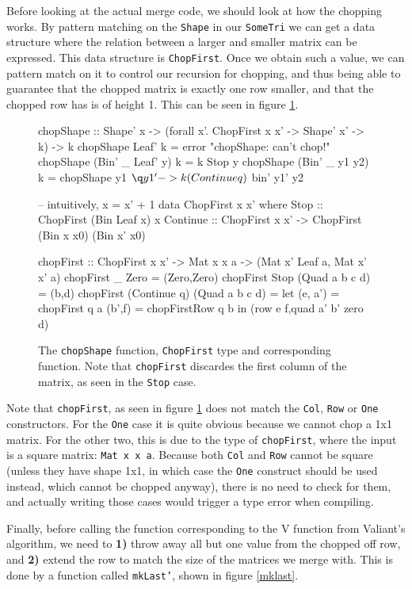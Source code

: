 \documentclass[a4paper,12pt,twosided]{report}
\begin{document}
Before looking at the actual merge code, we should look at how the chopping
works. By pattern matching on the \texttt{Shape} in our \texttt{SomeTri} we can
get a data structure where the relation between a larger and smaller matrix can
be expressed. This data structure is \texttt{ChopFirst}. Once we obtain such a
value, we can pattern match on it to control our recursion for chopping, and
thus being able to guarantee that the chopped matrix is exactly one row smaller,
and that the chopped row has is of height 1. This can be seen in figure
\ref{chopfirst}.

\begin{figure}[H]
\begin{code}
chopShape :: Shape' x 
          -> (forall x'. ChopFirst x x' -> Shape' x' -> k) -> k
chopShape Leaf' k = error "chopShape: can't chop!"
chopShape (Bin' _ Leaf' y) k = k Stop y
chopShape (Bin' _ y1 y2) k = 
    chopShape y1 $ \q y1' -> k (Continue q) $ bin' y1' y2

-- intuitively, x = x' + 1
data ChopFirst x x' where
  Stop :: ChopFirst (Bin Leaf x) x
  Continue :: ChopFirst x x' -> ChopFirst (Bin x x0) (Bin x' x0)

chopFirst :: ChopFirst x x' -> Mat x x a  
                            -> (Mat x' Leaf a, Mat x' x' a)
chopFirst _ Zero = (Zero,Zero)
chopFirst Stop (Quad a b c d) = (b,d)
chopFirst (Continue q) (Quad a b c d) =
  let  (e, a') = chopFirst q a
       (b',f)  = chopFirstRow q b
  in (row e f,quad a' b' zero d)
\end{code}
\caption{\label{chopfirst} The \texttt{chopShape} function, \texttt{ChopFirst}
type and corresponding function. Note that \texttt{chopFirst} discardes the
first column of the matrix, as seen in the \texttt{Stop} case.}
\end{figure}

Note that \texttt{chopFirst}, as seen in figure \ref{chopfirst} does not match
the \texttt{Col}, \texttt{Row} or \texttt{One} constructors. For the
\texttt{One} case it is quite obvious because we cannot chop a 1x1 matrix. For
the other two, this is due to the type of \texttt{chopFirst}, where the input is
a square matrix: \texttt{Mat x x a}. Because both \texttt{Col} and \texttt{Row}
cannot be square (unless they have shape 1x1, in which case the \texttt{One}
construct should be used instead, which cannot be chopped anyway), there is no
need to check for them, and actually writing those cases would trigger a type
error when compiling.

Finally, before calling the function corresponding to the V function from
Valiant's algorithm, we need to \textbf{1)} throw away all but one value from
the chopped off row, and \textbf{2)} extend the row to match the size of the
matrices we merge with. This is done by a function called \texttt{mkLast'},
shown in figure \ref{mklast}.
\end{document}

